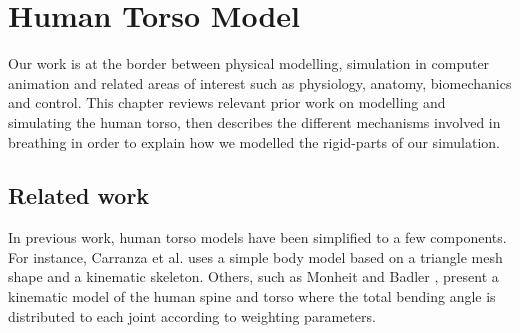 \chapter{\label{ch:human_torso_model}Human Torso Model}
Our work is at the border between physical modelling, simulation in computer animation and related areas of interest such as physiology, anatomy, biomechanics and control. This chapter reviews relevant prior work on modelling and simulating the human torso, then describes the different mechanisms involved in breathing in order to explain how we modelled the rigid-parts of our simulation.

\section{\label{sec:related_work}Related work}
In previous work, human torso models have been simplified to a few components. For instance, Carranza et al. \cite{carranza2003free} uses a simple body model based on a triangle mesh shape and a kinematic skeleton. Others, such as Monheit and Badler \cite{monheit2002kinematic}, present a kinematic model of the human spine and torso where the total bending angle is distributed to each joint according to weighting parameters.

